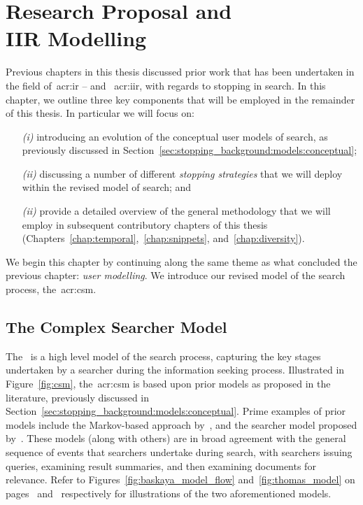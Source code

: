 
\chapter[Models and Proposal]{Research Proposal and\\IIR Modelling}\label{chap:proposal}


Previous chapters in this thesis discussed prior work that has been undertaken in the field of~\gls{acr:ir} -- and ~\gls{acr:iir}, with regards to stopping in search. In this chapter, we outline three key components that will be employed in the remainder of this thesis. In particular we will focus on:

\begin{itemize}
    \item[\emph{(i)}]{introducing an evolution of the conceptual user models of search, as previously discussed in Section~\ref{sec:stopping_background:models:conceptual};}
    \item[\emph{(ii)}]{discussing a number of different \emph{stopping strategies} that we will deploy within the revised model of search; and}
    \item[\emph{(ii)}]{provide a detailed overview of the general methodology that we will employ in subsequent contributory chapters of this thesis (Chapters~\ref{chap:temporal},~\ref{chap:snippets}, and~\ref{chap:diversity}).}
\end{itemize}

We begin this chapter by continuing along the same theme as what concluded the previous chapter: \emph{user modelling}. We introduce our revised model of the search process, the~\gls{acr:csm}.

\section{The Complex Searcher Model}\label{sec:proposal:csm}
The~ is a high level model of the search process, capturing the key stages undertaken by a searcher during the information seeking process. Illustrated in Figure~\ref{fig:csm}, the~\gls{acr:csm} is based upon prior models as proposed in the literature, previously discussed in Section~\ref{sec:stopping_background:models:conceptual}. Prime examples of prior models include the Markov-based approach by~\cite{baskaya2013behavioural_factors}, and the searcher model proposed by~\cite{thomas2014modelling_behaviour}. These models (along with others) are in broad agreement with the general sequence of events that searchers undertake during search, with searchers issuing queries, examining result summaries, and then examining documents for relevance. Refer to Figures~\ref{fig:baskaya_model_flow} and~\ref{fig:thomas_model} on pages~\pageref{fig:baskaya_model_flow} and~\pageref{fig:thomas_model} respectively for illustrations of the two aforementioned models.

